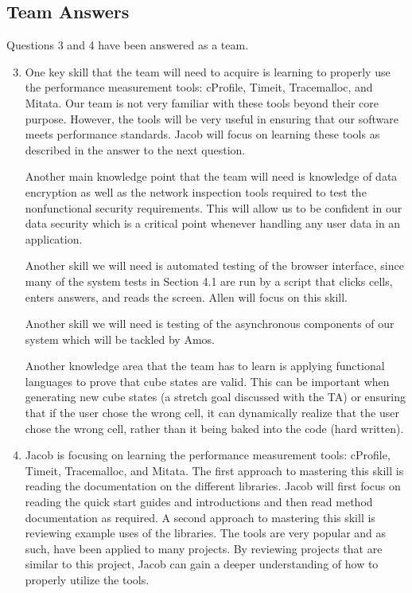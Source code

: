 \documentclass[12pt, titlepage]{article}
\begin{document}
\subsection*{Team Answers}

Questions 3 and 4 have been answered as a team.

\begin{enumerate}
  \setcounter{enumi}{2}
   \item One key skill that the team will need to acquire is learning to properly use the performance measurement tools: cProfile, Timeit, Tracemalloc, and Mitata. Our team is not very familiar with these tools beyond their core purpose. However, the tools will be very useful in ensuring that our software meets performance standards. Jacob will focus on learning these tools as described in the answer to the next question.
  
  Another main knowledge point that the team will need is knowledge of data encryption as well as the network inspection tools required to test the nonfunctional security requirements. This will allow us to be confident in our data security which is a critical point whenever handling any user data in an application. 
  
  Another skill we will need is automated testing of the browser interface, since many of the system tests in Section 4.1 are run by a script that clicks cells, enters answers, and reads the screen. Allen will focus on this skill.
  
  Another skill we will need is testing of the asynchronous components of our system which will be tackled by Amos.
  
  Another knowledge area that the team has to learn is applying functional languages to prove that cube states are valid. This can be important when generating new cube states (a stretch goal discussed with the TA) or ensuring that if the user chose the wrong cell, it can dynamically realize that the user chose the wrong cell, rather than it being baked into the code (hard written).
  
  \item Jacob is focusing on learning the performance measurement tools: cProfile, Timeit, Tracemalloc, and Mitata. The first approach to mastering this skill is reading the documentation on the different libraries. Jacob will first focus on reading the quick start guides and introductions and then read method documentation as required. A second approach to mastering this skill is reviewing example uses of the libraries. The tools are very popular and as such, have been applied to many projects. By reviewing projects that are similar to this project, Jacob can gain a deeper understanding of how to properly utilize the tools.
  

\end{enumerate}
\end{document}
